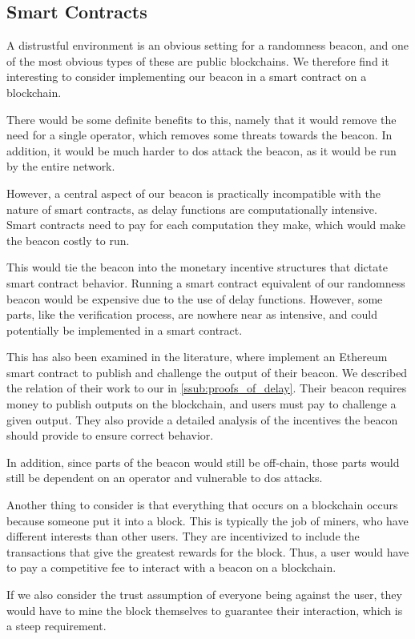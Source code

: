 \subsection{Smart Contracts}
A distrustful environment is an obvious setting for a randomness beacon, and one of the most obvious types of these are public blockchains.
We therefore find it interesting to consider implementing our beacon in a smart contract on a blockchain.

There would be some definite benefits to this, namely that it would remove the need for a single operator, which removes some threats towards the beacon.
In addition, it would be much harder to \gls{dos} attack the beacon, as it would be run by the entire network.

However, a central aspect of our beacon is practically incompatible with the nature of smart contracts, as delay functions are computationally intensive.
Smart contracts need to pay for each computation they make, which would make the beacon costly to run.

This would tie the beacon into the monetary incentive structures that dictate smart contract behavior.
Running a smart contract equivalent of our randomness beacon would be expensive due to the use of delay functions.
However, some parts, like the verification process, are nowhere near as intensive, and could potentially be implemented in a smart contract.

This has also been examined in the literature, where \citet{bunz2017proofsof} implement an Ethereum smart contract to publish and challenge the output of their beacon.
We described the relation of their work to our in \vref{ssub:proofs_of_delay}.
Their beacon requires money to publish outputs on the blockchain, and users must pay to challenge a given output.
They also provide a detailed analysis of the incentives the beacon should provide to ensure correct behavior.

In addition, since parts of the beacon would still be off-chain, those parts would still be dependent on an operator and vulnerable to \acrshort{dos} attacks.

Another thing to consider is that everything that occurs on a blockchain occurs because someone put it into a block.
This is typically the job of miners, who have different interests than other users.
They are incentivized to include the transactions that give the greatest rewards for the block.
Thus, a user would have to pay a competitive fee to interact with a beacon on a blockchain.

If we also consider the trust assumption of everyone being against the user, they would have to mine the block themselves to guarantee their interaction, which is a steep requirement.

